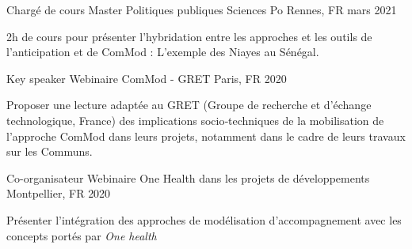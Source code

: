 

\begin{cventries}
  \cventry
    {Chargé de cours} %
    {Master Politiques publiques} %
    {Sciences Po Rennes, FR} %
    {mars 2021} %
    {
      \begin{cvitems} %
      2h de cours pour présenter l'hybridation entre les approches et les outils de l'anticipation et de ComMod : L'exemple des Niayes au Sénégal.
      \end{cvitems}
    }
      \cventry
        {Key speaker} %
        {Webinaire ComMod - GRET} %
        {Paris, FR} %
        {2020} %
        {
          \begin{cvitems} %
            Proposer une lecture adaptée au GRET (Groupe de recherche et d’échange technologique, France) des implications socio‑techniques de la mobilisation de l’approche ComMod dans leurs projets, notamment dans le cadre de leurs travaux sur les Communs.
          \end{cvitems}
        }
      \cventry
        {Co-organisateur} %
        {Webinaire One Health dans les projets de développements} %
        {Montpellier, FR} %
        {2020} %
        {
          \begin{cvitems} %
            Présenter l'intégration des approches de modélisation d'accompagnement avec les concepts portés par \textit{One health}
          \end{cvitems}
        }


\end{cventries}
